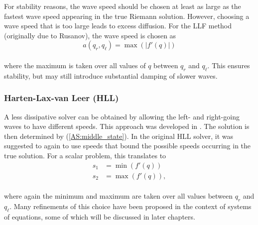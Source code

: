 \documentclass[11pt]{article}
\makeatletter
\newcommand{\boxspacing}{\kern\kvtcb@left@rule\kern\kvtcb@boxsep}
\newcommand{\prompt}[4]{
        \ttfamily\llap{{\color{#2}[#3]:\hspace{3pt}#4}}\vspace{-\baselineskip}
    }
\makeatother
\begin{document}
For stability reasons, the wave speed should be chosen at least as large
as the fastest wave speed appearing in the true Riemann solution.
However, choosing a wave speed that is too large leads to excess
diffusion. For the LLF method (originally due to Rusanov), the wave
speed is chosen as \[a(q_r, q_\ell) = \max(|f'(q)|)\]\\
where the maximum is taken over all values of \(q\) between \(q_r\) and
\(q_\ell\). This ensures stability, but may still introduce substantial
damping of slower waves.

    \hypertarget{harten-lax-van-leer-hll}{%
\subsubsection{Harten-Lax-van Leer
(HLL)}\label{harten-lax-van-leer-hll}}

    A less dissipative solver can be obtained by allowing the left- and
right-going waves to have different speeds. This approach was developed
in \cite{HLL}. The solution is then determined by
(\ref{AS:middle_state}). In the original HLL solver, it was suggested to
again to use speeds that bound the possible speeds occurring in the true
solution. For a scalar problem, this translates to\\
\begin{align*}
s_1 & = \min(f'(q)) \\
s_2 & = \max(f'(q)),
\end{align*}\\
where again the minimum and maximum are taken over all values between
\(q_r\) and \(q_\ell\). Many refinements of this choice have been
proposed in the context of systems of equations, some of which will be
discussed in later chapters.

    \begin{tcolorbox}[breakable, size=fbox, boxrule=1pt, pad at break*=1mm,colback=cellbackground, colframe=cellborder]
\prompt{In}{incolor}{ }{\boxspacing}
\begin{Verbatim}[commandchars=\\\{\}]

\end{Verbatim}
\end{tcolorbox}


    
    
    
\end{document}
